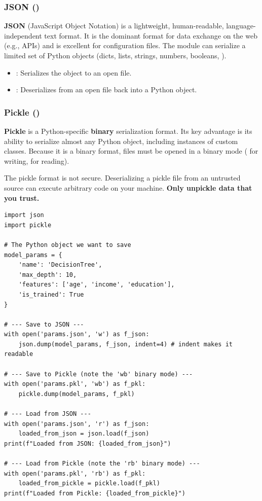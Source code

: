 \subsubsection*{JSON ()}
\textbf{JSON} (JavaScript Object Notation) is a lightweight, human-readable, language-independent text format. It is the dominant format for data exchange on the web (e.g., APIs) and is excellent for configuration files. The  module can serialize a limited set of Python objects (dicts, lists, strings, numbers, booleans, ).
\begin{itemize}
    \item {}: Serializes the object to an open file.
    \item {}: Deserializes from an open file back into a Python object.
\end{itemize}

\subsubsection*{Pickle ()}
\textbf{Pickle} is a Python-specific \textbf{binary} serialization format. Its key advantage is its ability to serialize almost any Python object, including instances of custom classes. Because it is a binary format, files must be opened in a binary mode ( for writing,  for reading).

\begin{remark}
The pickle format is not secure. Deserializing a pickle file from an untrusted source can execute arbitrary code on your machine. \textbf{Only unpickle data that you trust.}
\end{remark}

\begin{example}
\text{ }\begin{verbatim}
import json
import pickle

# The Python object we want to save
model_params = {
    'name': 'DecisionTree',
    'max_depth': 10,
    'features': ['age', 'income', 'education'],
    'is_trained': True
}

# --- Save to JSON ---
with open('params.json', 'w') as f_json:
    json.dump(model_params, f_json, indent=4) # indent makes it readable

# --- Save to Pickle (note the 'wb' binary mode) ---
with open('params.pkl', 'wb') as f_pkl:
    pickle.dump(model_params, f_pkl)

# --- Load from JSON ---
with open('params.json', 'r') as f_json:
    loaded_from_json = json.load(f_json)
print(f"Loaded from JSON: {loaded_from_json}")

# --- Load from Pickle (note the 'rb' binary mode) ---
with open('params.pkl', 'rb') as f_pkl:
    loaded_from_pickle = pickle.load(f_pkl)
print(f"Loaded from Pickle: {loaded_from_pickle}")
\end{verbatim}
\end{example}

